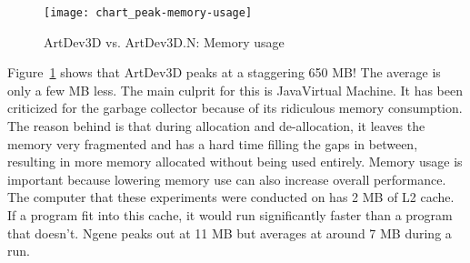 \begin{figure}[!ht]
	\centering
	\texttt{[image: chart\_peak-memory-usage]}
	\caption{ArtDev3D vs. ArtDev3D.N: Memory usage}
	\label{chart_peak-memory-usage}
\end{figure}

Figure~\ref{chart_peak-memory-usage} shows that ArtDev3D peaks at a staggering 650 MB! The average is only a few MB less. The main culprit for this is Java\texttrademark Virtual Machine. It has been criticized\cite{maio2008} for the garbage collector because of its ridiculous memory consumption. The reason behind is that during allocation and de-allocation, it leaves the memory very fragmented and has a hard time filling the gaps in between, resulting in more memory allocated without being used entirely. Memory usage is important because lowering memory use can also increase overall performance. The computer that these experiments were conducted on has 2 MB of L2 cache. If a program fit into this cache, it would run significantly faster than a program that doesn't. Ngene peaks out at 11 MB but averages at around 7 MB during a run.
